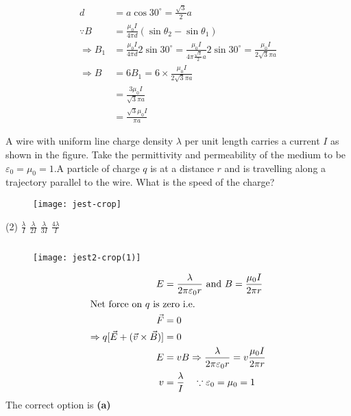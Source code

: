 \begin{enumerate}
\begin{answer}
\begin{align*}
		d&=a \cos 30^{\circ}=\frac{\sqrt{3}}{2} a \\
		\because B&=\frac{\mu_{0} I}{4 \pi d}\left(\sin \theta_{2}-\sin \theta_{1}\right) \\
		\Rightarrow B_{1}&=\frac{\mu_{0} I}{4 \pi d} 2 \sin 30^{\circ}=\frac{\mu_{0} I}{4 \pi \frac{\sqrt{3}}{2} a} 2 \sin 30^{\circ}=\frac{\mu_{0} I}{2 \sqrt{3} \pi a} \\
		\Rightarrow B&=6 B_{1}=6 \times \frac{\mu_{0} I}{2 \sqrt{3} \pi a}\\&=\frac{3 \mu_{0} I}{\sqrt{3} \pi a}\\&=\frac{\sqrt{3} \mu_{0} I}{\pi a}
		\end{align*}
	\end{answer}
	\begin{minipage}{\textwidth}
		\item A wire with uniform line charge density $\lambda$ per unit length carries a current $I$ as shown in the figure. Take the permittivity and permeability of the medium to be $\varepsilon_{0}=\mu_{0}=1 . \mathrm{A}$ particle of charge $q$ is at a distance $r$ and is travelling along a trajectory parallel to the wire. What is the speed of the charge?
		\begin{figure}[H]
			\centering
			\texttt{[image: jest-crop]}
		\end{figure}
	\end{minipage}
	\begin{tasks}(2)
		\task[\textbf{A.}] $\frac{\lambda}{I}$ 
		\task[\textbf{B.}]$\frac{\lambda}{2 I}$
		\task[\textbf{C.}]$\frac{\lambda}{3 I}$
		\task[\textbf{D.}]$\frac{4 \lambda}{I}$
	\end{tasks}
	\begin{answer}$\left. \right. $\\
		\begin{figure}[H]
			\centering
			\texttt{[image: jest2-crop(1)]}
		\end{figure}
	\begin{align*}
		E&=\frac{\lambda}{2 \pi \varepsilon_{0} r} \text { and } B=\frac{\mu_{0} I}{2 \pi r}\\
	\intertext{Net force on  $q$ is zero i.e.}
	\vec{F}&=0\\
	\Rightarrow q[\vec{E}+(\vec{v} \times \vec{B})]&=0\\
	E&=v B \Rightarrow \frac{\lambda}{2 \pi \varepsilon_{0} r}=v \frac{\mu_{0} I}{2 \pi r} \\ v&=\frac{\lambda}{I} \quad \because \varepsilon_{0}=\mu_{0}=1
	\end{align*}
The correct option is \textbf{(a)}	
	\end{answer}
\end{enumerate}